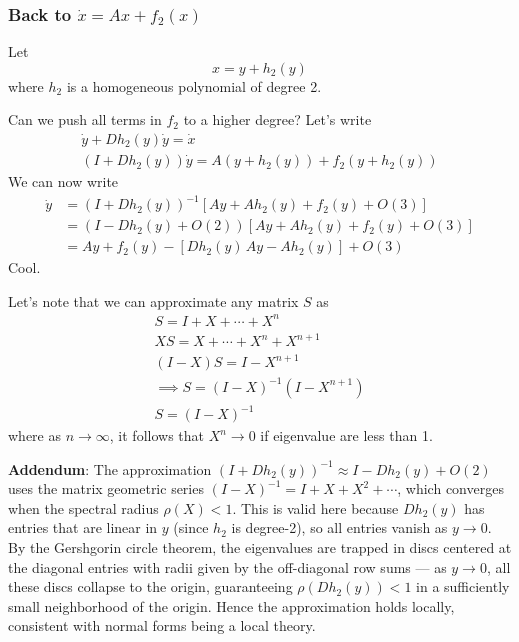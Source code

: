 \documentclass{article}
\begin{document}
\subsubsection{Back to $\dot{x}=Ax+f_2(x)$}

Let
\[
x=y+h_2(y)
\]
where $h_2$ is a homogeneous polynomial of degree 2.

Can we push all terms in $f_2$ to a higher degree? Let's write 
\begin{gather*}
    \dot{y}+Dh_2(y)\dot{y}=\dot{x}\\
    \left(I + Dh_2(y)\right)\dot{y}= A \left(y+h_2(y)\right) + f_2\left(y+h_2(y)\right)
\end{gather*}
We can now write 
\begin{align*}
    \dot{y}&=\left(I + Dh_2(y)\right)^{-1}\left[Ay + Ah_2(y) + f_2(y) + O(3)\right]\\
    &=\left(I-Dh_2(y)+O(2)\right)\left[Ay + Ah_2(y) + f_2(y) + O(3)\right]\\
    &=Ay + f_2(y) - \left[ Dh_2(y)\, Ay - Ah_2(y) \right] + O(3)
\end{align*}
Cool.

Let's note that we can approximate any matrix $S$ as 
\begin{gather*}
    S=I+ X +\cdots + X^n\\
    XS = X +\cdots + X^n + X^{n+1}\\
    \left(I-X\right)S = I - X^{n+1}\\
    \implies S = \left(I-X\right)^{-1}\left(I-X^{n+1}\right)\\
    S = \left(I-X\right)^{-1}
\end{gather*}
where as $n\to\infty$, it follows that $X^n\to 0$ if eigenvalue are less than 1.
\clearpage
\begin{mdframed}
\textbf{Addendum}: The approximation $(I + Dh_2(y))^{-1} \approx I - Dh_2(y) + O(2)$ uses the matrix geometric series $(I - X)^{-1} = I + X + X^2 + \cdots$, which converges when the spectral radius $\rho(X) < 1$. This is valid here because $Dh_2(y)$ has entries that are linear in $y$ (since $h_2$ is degree-2), so all entries vanish as $y \to 0$. By the Gershgorin circle theorem, the eigenvalues are trapped in discs centered at the diagonal entries with radii given by the off-diagonal row sums — as $y \to 0$, all these discs collapse to the origin, guaranteeing $\rho(Dh_2(y)) < 1$ in a sufficiently small neighborhood of the origin. Hence the approximation holds locally, consistent with normal forms being a local theory.
\end{mdframed}
\end{document}

